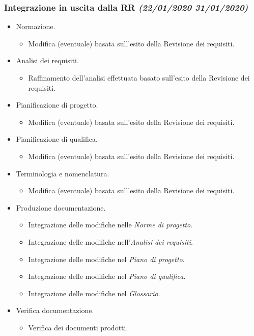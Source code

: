 \documentclass[../piano-di-progetto.tex]{subfiles}
\begin{document}
\subsubsection[Integrazione in uscita dalla RR]{Integrazione in uscita dalla RR {\normalsize\normalfont\itshape(22/01/2020  31/01/2020)}}%
\label{subs:integrazione_in_uscita_dalla_rr}
\begin{itemize}
  \item Normazione.
  \begin{itemize}
    \item Modifica (eventuale) basata sull'esito della Revisione dei requisiti.
  \end{itemize}
  \item Analisi dei requisiti.
  \begin{itemize}
    \item Raffinamento dell'analisi effettuata basato sull'esito della Revisione dei requisiti.
  \end{itemize}
  \item Pianificazione di progetto.
  \begin{itemize}
    \item Modifica (eventuale) basata sull'esito della Revisione dei requisiti.
  \end{itemize}
  \item Pianificazione di qualifica.
  \begin{itemize}
    \item Modifica (eventuale) basata sull'esito della Revisione dei requisiti.
  \end{itemize}
  \item Terminologia e nomenclatura.
  \begin{itemize}
    \item Modifica (eventuale) basata sull'esito della Revisione dei requisiti.
  \end{itemize}
  \item Produzione documentazione.
  \begin{itemize}
    \item Integrazione delle modifiche nelle \textit{Norme di progetto}.
    \item Integrazione delle modifiche nell'\textit{Analisi dei requisiti}.
    \item Integrazione delle modifiche nel \textit{Piano di progetto}.
    \item Integrazione delle modifiche nel \textit{Piano di qualifica}.
    \item Integrazione delle modifiche nel \textit{Glossario}.
  \end{itemize}
  \item Verifica documentazione.
  \begin{itemize}
    \item Verifica dei documenti prodotti.
  \end{itemize}
\end{itemize}
\end{document}
